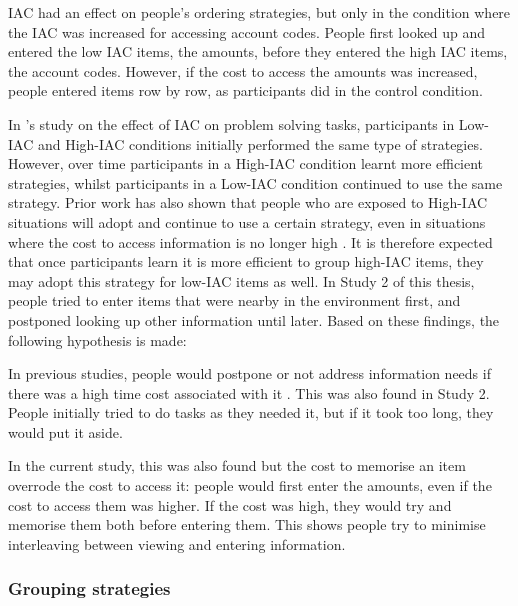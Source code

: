IAC had an effect on people's ordering strategies, but only in the condition where the IAC was increased for accessing account codes. People first looked up and entered the low IAC items, the amounts, before they entered the high IAC items, the account codes. However, if the cost to access the amounts was increased, people entered items row by row, as participants did in the control condition.

In \citet{OHara1998}'s study on the effect of IAC on problem solving tasks, participants in Low-IAC and High-IAC conditions initially performed the same type of strategies. However, over time participants in a High-IAC condition  learnt more efficient strategies, whilst participants in a Low-IAC condition continued to use the same strategy. Prior work has also shown that people who are exposed to High-IAC situations will adopt and continue to use a certain strategy, even in situations where the cost to access information is no longer high \citep{Patrick2014}. It is therefore expected that once participants learn it is more efficient to group high-IAC items, they may adopt this strategy for low-IAC items as well. In Study 2 of this thesis, people tried to enter items that were nearby in the environment first, and postponed looking up other information until later. Based on these findings, the following hypothesis is made: 

In previous studies, people would postpone or not address information needs if there was a high time cost associated with it \citep{Sohn2008}. This was also found in Study 2. People initially tried to do tasks as they needed it, but if it took too long, they would put it aside.

In the current study, this was also found but the cost to memorise an item overrode the cost to access it: people would first enter the amounts, even if the cost to access them was higher.
If the cost was high, they would try and memorise them both before entering them. This shows people try to minimise interleaving between viewing and entering information. 

\subsubsection{Grouping strategies}

